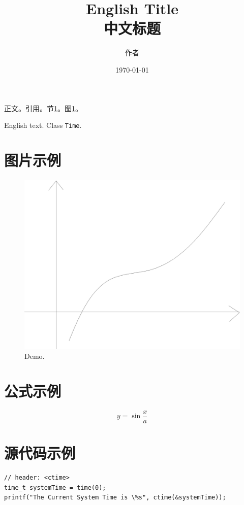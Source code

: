 \documentclass[UTF8]{ctexart}
\newcommand{\code}{\texttt}
\begin{document}
\title{English Title \\中文标题}
\author{作者}
\date{\today}

\pretitle{\begin{flushleft}\heiti \huge} \posttitle{\end{flushleft}}
\preauthor{\begin{flushright}\heiti} \postauthor{\end{flushright}}
\predate{\begin{flushright}\heiti}\postdate{\end{flushright}}
\maketitle

正文。引用\cite{Box1998}。节\ref{sec:fig}。图\ref{fig:demo}。

English text. Class \code{Time}.

\section{图片示例}\label{sec:fig}

\begin{figure}[htbp]
\centering
\label{fig:demo}
\includegraphics[scale=0.25]{figures/fig32a}
\caption{Demo.}
\end{figure}

\section{公式示例}
$$y = \sin \frac{x}{a}$$

\section{源代码示例}

\begin{lstlisting}
// header: <ctime>
time_t systemTime = time(0);
printf("The Current System Time is \%s", ctime(&systemTime));
\end{lstlisting}



\end{document}
